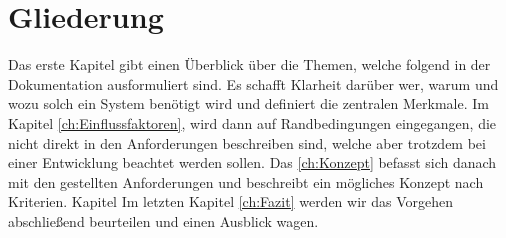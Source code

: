 \section{Gliederung}
Das erste Kapitel gibt einen Überblick über die Themen, welche folgend in der Dokumentation ausformuliert sind. Es schafft Klarheit darüber wer, warum und wozu solch ein System benötigt wird und definiert die zentralen Merkmale.  Im Kapitel \ref{ch:Einflussfaktoren}, wird dann auf Randbedingungen eingegangen, die nicht direkt in den Anforderungen beschreiben sind, welche aber trotzdem bei einer Entwicklung beachtet werden sollen. Das \ref{ch:Konzept} befasst sich danach mit den gestellten Anforderungen und beschreibt ein mögliches Konzept nach Kriterien. Kapitel Im letzten Kapitel \ref{ch:Fazit} werden wir das Vorgehen abschließend beurteilen und einen Ausblick wagen.